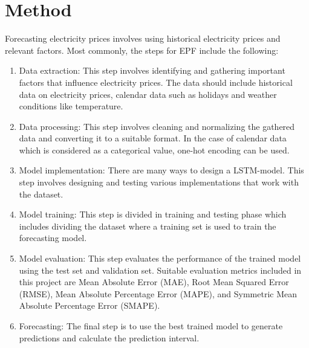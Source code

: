 
\chapter{Method}
\label{cha:method}

Forecasting electricity prices involves using historical electricity prices and relevant factors. Most commonly, the steps for EPF include the following:
\begin{enumerate}
    \item Data extraction: This step involves identifying and gathering important factors that influence electricity prices. The data should include historical data on electricity prices, calendar data such as holidays and weather conditions like temperature.
    \item Data processing: This step involves cleaning and normalizing the gathered data and converting it to a suitable format. In the case of calendar data which is considered as a categorical value, one-hot encoding can be used. 
    \item Model implementation: There are many ways to design a LSTM-model. This step involves designing and testing various implementations that work with the dataset. 
    \item Model training: This step is divided in training and testing phase which includes dividing the dataset where a training set is used to train the forecasting model.
    \item Model evaluation: This step evaluates the performance of the trained model using the test set and validation set. Suitable evaluation metrics included in this project are Mean Absolute Error (MAE), Root Mean Squared Error (RMSE), Mean Absolute Percentage Error (MAPE), and Symmetric Mean Absolute Percentage Error (SMAPE). 
    \item Forecasting: The final step is to use the best trained model to generate predictions and calculate the prediction interval.
\end{enumerate}

